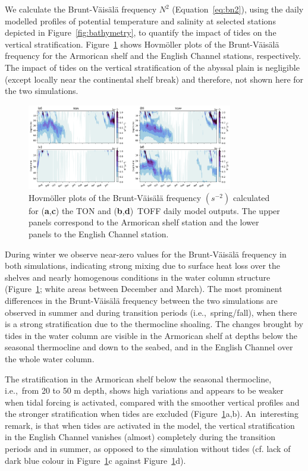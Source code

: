 \documentclass[jmse,article,accept,moreauthors,pdftex]{Definitions/mdpi}
\begin{document}
We calculate the Brunt-V\"ais\"al\"a frequency $N^2$ (Equation~\eqref{eq:bn2}), using the daily modelled profiles of potential temperature and salinity at selected stations depicted in Figure~\ref{fig:bathymetry}, to quantify the impact of tides on the vertical stratification. Figure~\ref{fig:bn2} shows Hovm\"oller plots of the Brunt-V\"ais\"al\"a frequency for the Armorican shelf and the English Channel stations, respectively. The impact of tides on the vertical stratification of the abyssal plain is negligible (except locally near the continental shelf break) and therefore, not shown here for the two simulations.

\begin{figure}[H]
    \centering
    \includegraphics[width=0.8\textwidth]{Definitions/figure9.png}
    \caption{Hovm\"oller plots of the Brunt-V\"ais\"al\"a frequency $(s^{-2})$ calculated for (\textbf{a},\textbf{c}) the TON and (\textbf{b},\textbf{d})~TOFF daily model outputs. The upper panels correspond to the Armorican shelf station and the lower panels to the English Channel station.}
    \label{fig:bn2}
\end{figure}

During winter we observe near-zero values for the Brunt-V\"ais\"al\"a frequency in both simulations, indicating strong mixing due to surface heat loss over the shelves and nearly homogenous conditions in the water column structure (Figure~\ref{fig:bn2}; white areas between December and March). The most prominent differences in the Brunt-V\"ais\"al\"a frequency between the two simulations are observed in summer and during transition periods (i.e.,~spring/fall), when there is a strong stratification due to the thermocline shoaling. The changes brought by tides in the water column are visible in the Armorican shelf at depths below the seasonal thermocline and down to the seabed, and in the English Channel over the whole water column. 

The stratification in the Armorican shelf below the seasonal thermocline, i.e.,~from 20 to 50 m depth, shows high variations and appears to be weaker when tidal forcing is activated, compared with the smoother vertical profiles and the stronger stratification when tides are excluded (Figure~\ref{fig:bn2}a,b). An~interesting remark, is that when tides are activated in the model, the vertical stratification in the English Channel vanishes (almost) completely during the transition periods and in summer, as opposed to the simulation without tides (cf. lack of dark blue colour in Figure~\ref{fig:bn2}c against Figure~\ref{fig:bn2}d).
\end{document}
